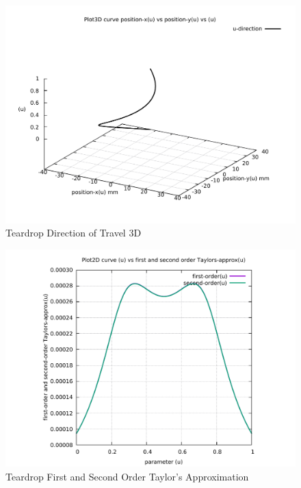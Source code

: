 \begin{figure}
	\caption     {Teardrop Direction of Travel 3D}
	\label{04-img-Teardrop Direction of Travel 3D.pdf}
	\includegraphics[width=1.00\textwidth]{Chap4/appendix/app-Teardrop/plots/04-img-Teardrop Direction of Travel 3D.pdf}
\end{figure}

\clearpage
\pagebreak

\begin{figure}
	\caption     {Teardrop First and Second Order Taylor's Approximation}
	\label{05-img-Teardrop-First-and-Second-Order-Taylors-Approx.pdf}
	\includegraphics[width=1.00\textwidth]{Chap4/appendix/app-Teardrop/plots/05-img-Teardrop-First-and-Second-Order-Taylors-Approx.pdf}
\end{figure}


